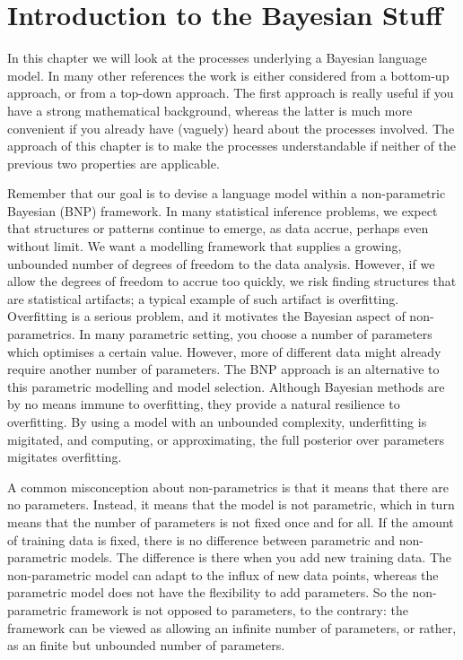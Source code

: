 \chapter{Introduction to the Bayesian Stuff}

In this chapter we will look at the processes underlying a Bayesian language model. In many other references the work is either considered from a bottom-up approach, or from a top-down approach. The first approach is really useful if you have a strong mathematical background, whereas the latter is much more convenient if you already have (vaguely) heard about the processes involved. The approach of this chapter is to make the processes understandable if neither of the previous two properties are applicable.

Remember that our goal is to devise a language model within a non-parametric Bayesian (BNP) framework. In many statistical inference problems, we expect that structures or patterns continue to emerge, as data accrue, perhaps even without limit. We want a modelling framework that supplies a growing, unbounded number of degrees of freedom to the data analysis. However, if we allow the degrees of freedom to accrue too quickly, we risk finding structures that are statistical artifacts; a typical example of such artifact is overfitting. Overfitting is a serious problem, and it motivates the Bayesian aspect of non-parametrics. In many parametric setting, you choose a number of parameters which optimises a certain value. However, more of different data might already require another number of parameters. The BNP approach is an alternative to this parametric modelling and model selection. Although Bayesian methods are by no means immune to overfitting, they provide a natural resilience to overfitting. By using a model with an unbounded complexity, underfitting is migitated, and computing, or approximating, the full posterior over parameters migitates overfitting.

A common misconception about non-parametrics is that it means that there are no parameters. Instead, it means that the model is not parametric, which in turn means that the number of parameters is not fixed once and for all. If the amount of training data is fixed, there is no difference between parametric and non-parametric models. The difference is there when you add new training data. The non-parametric model can adapt to the influx of new data points, whereas the parametric model does not have the flexibility to add parameters. So the non-parametric framework is not opposed to parameters, to the contrary: the framework can be viewed as allowing an infinite number of parameters, or rather, as an finite but unbounded number of parameters.

